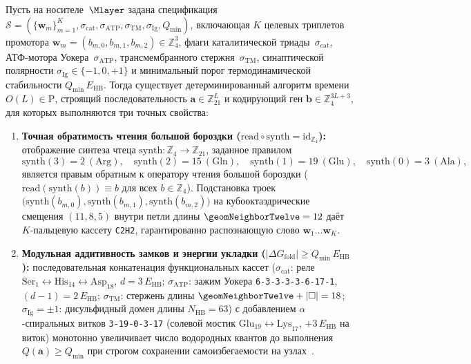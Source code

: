 \begin{theorem}
\label{thm:bio-constructive-inverse-folding}
Пусть на носителе~$\Mlayer$ задана спецификация $\mathcal{S} = (\{\mathbf{w}_m\}_{m=1}^{K}, \sigma_{\mathrm{cat}}, \sigma_{\mathrm{ATP}}, \sigma_{\mathrm{TM}}, \sigma_{\mathrm{Ig}}, Q_{\mathrm{min}})$, включающая $K$ целевых триплетов промотора $\mathbf{w}_m = (b_{m,0}, b_{m,1}, b_{m,2})\in\mathbb{Z}_4^3$, флаги каталитической триады~$\sigma_{\mathrm{cat}}$, АТФ-мотора Уокера~$\sigma_{\mathrm{ATP}}$, трансмембранного стержня~$\sigma_{\mathrm{TM}}$, синаптической полярности $\sigma_{\mathrm{Ig}}\in\{-1,0,+1\}$ и минимальный порог термодинамической стабильности $Q_{\mathrm{min}}\,E_{\mathrm{HB}}$. Тогда существует детерминированный алгоритм времени $O(L)\in\mathrm{P}$, строящий последовательность $\mathbf{a}\in\mathbb{Z}_{21}^L$ и кодирующий ген $\mathbf{b}\in\mathbb{Z}_4^{3L+3}$, для которых выполняются три точных свойства:
\begin{enumerate}[leftmargin=*]
\item \textbf{Точная обратимость чтения большой бороздки ($\mathrm{read}\circ\mathrm{synth} = \mathrm{id}_{\mathbb{Z}_4}$):}
  отображение синтеза чтеца $\mathrm{synth}:\mathbb{Z}_4 \to \mathbb{Z}_{21}$, заданное правилом
  \begin{equation}
  \label{eq:bio-inverse-groove-reader}
    \mathrm{synth}(3) = 2\ (\text{Arg}),\quad
    \mathrm{synth}(2) = 15\ (\text{Gln}),\quad
    \mathrm{synth}(1) = 19\ (\text{Glu}),\quad
    \mathrm{synth}(0) = 3\ (\text{Ala}),
  \end{equation}
  является правым обратным к оператору чтения большой бороздки ($\mathrm{read}(\mathrm{synth}(b)) \equiv b$ для всех $b\in\mathbb{Z}_4$). Подстановка троек $\bigl(\mathrm{synth}(b_{m,0}),\mathrm{synth}(b_{m,1}),\mathrm{synth}(b_{m,2})\bigr)$ на кубооктаэдрические смещения $(11, 8, 5)$ внутри петли длины $\geomNeighborTwelve = 12$ даёт $K$-пальцевую кассету \texttt{C2H2}, гарантированно распознающую слово $\mathbf{w}_1\ldots\mathbf{w}_K$.
\item \textbf{Модульная аддитивность замков и энергии укладки ($|\Delta G_{\mathrm{fold}}| \ge Q_{\mathrm{min}}\,E_{\mathrm{HB}}$):}
  последовательная конкатенация функциональных кассет ($\sigma_{\mathrm{cat}}$: реле $\text{Ser}_1\leftrightarrow\text{His}_{14}\leftrightarrow\text{Asp}_{18}$, $d=3\,E_{\mathrm{HB}}$; $\sigma_{\mathrm{ATP}}$: зажим Уокера \texttt{6-3-3-3-3-6-17-1}, $(d-1)=2\,E_{\mathrm{HB}}$; $\sigma_{\mathrm{TM}}$: стержень длины $\geomNeighborTwelve+|\square|=18$; $\sigma_{\mathrm{Ig}}=\pm 1$: дисульфидный домен длины $N_{\mathrm{HB}}=63$) с добавлением $\alpha$-спиральных витков \texttt{3-19-0-3-17} (солевой мостик $\text{Glu}_{19}\leftrightarrow\text{Lys}_{17}$, $+3\,E_{\mathrm{HB}}$ на виток) монотонно увеличивает число водородных квантов до выполнения $Q(\mathbf{a}) \ge Q_{\mathrm{min}}$ при строгом сохранении самоизбегаемости на узлах~\latGCKshort.

\end{enumerate}
\end{theorem}
